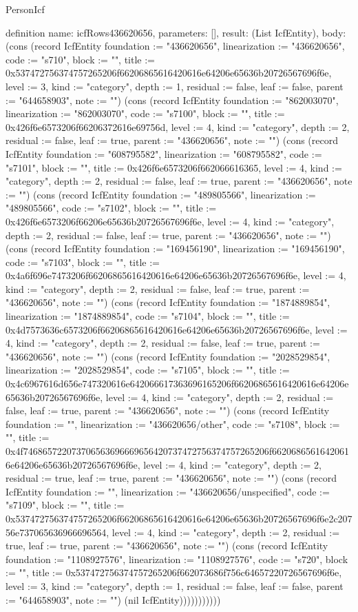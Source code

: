 \begin{lexlean}{PersonIcf}
\begin{semanticmodule}
definition{
  name: icfRows436620656,
  parameters: [],
  result: (List IcfEntity),
  body: (cons (record IcfEntity {foundation := "436620656", linearization := "436620656", code := "s710", block := "", title := 0x537472756374757265206f66206865616420616e64206e65636b20726567696f6e, level := 3, kind := "category", depth := 1, residual := false, leaf := false, parent := "644658903", note := ""}) (cons (record IcfEntity {foundation := "862003070", linearization := "862003070", code := "s7100", block := "", title := 0x426f6e6573206f66206372616e69756d, level := 4, kind := "category", depth := 2, residual := false, leaf := true, parent := "436620656", note := ""}) (cons (record IcfEntity {foundation := "608795582", linearization := "608795582", code := "s7101", block := "", title := 0x426f6e6573206f662066616365, level := 4, kind := "category", depth := 2, residual := false, leaf := true, parent := "436620656", note := ""}) (cons (record IcfEntity {foundation := "489805566", linearization := "489805566", code := "s7102", block := "", title := 0x426f6e6573206f66206e65636b20726567696f6e, level := 4, kind := "category", depth := 2, residual := false, leaf := true, parent := "436620656", note := ""}) (cons (record IcfEntity {foundation := "169456190", linearization := "169456190", code := "s7103", block := "", title := 0x4a6f696e7473206f66206865616420616e64206e65636b20726567696f6e, level := 4, kind := "category", depth := 2, residual := false, leaf := true, parent := "436620656", note := ""}) (cons (record IcfEntity {foundation := "1874889854", linearization := "1874889854", code := "s7104", block := "", title := 0x4d7573636c6573206f66206865616420616e64206e65636b20726567696f6e, level := 4, kind := "category", depth := 2, residual := false, leaf := true, parent := "436620656", note := ""}) (cons (record IcfEntity {foundation := "2028529854", linearization := "2028529854", code := "s7105", block := "", title := 0x4c6967616d656e747320616e642066617363696165206f66206865616420616e64206e65636b20726567696f6e, level := 4, kind := "category", depth := 2, residual := false, leaf := true, parent := "436620656", note := ""}) (cons (record IcfEntity {foundation := "", linearization := "436620656/other", code := "s7108", block := "", title := 0x4f746865722073706563696669656420737472756374757265206f66206865616420616e64206e65636b20726567696f6e, level := 4, kind := "category", depth := 2, residual := true, leaf := true, parent := "436620656", note := ""}) (cons (record IcfEntity {foundation := "", linearization := "436620656/unspecified", code := "s7109", block := "", title := 0x537472756374757265206f66206865616420616e64206e65636b20726567696f6e2c20756e737065636966696564, level := 4, kind := "category", depth := 2, residual := true, leaf := true, parent := "436620656", note := ""}) (cons (record IcfEntity {foundation := "1108927576", linearization := "1108927576", code := "s720", block := "", title := 0x537472756374757265206f662073686f756c64657220726567696f6e, level := 3, kind := "category", depth := 1, residual := false, leaf := false, parent := "644658903", note := ""}) (nil IcfEntity)))))))))))
}


\end{semanticmodule}
\end{lexlean}
